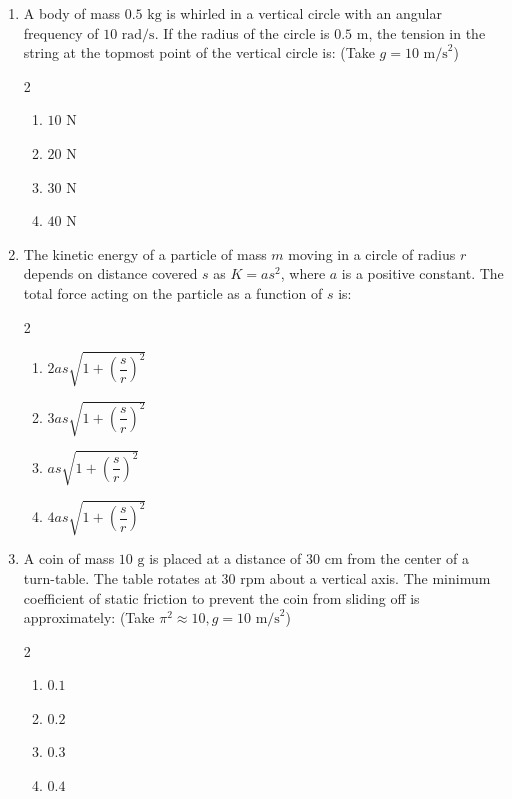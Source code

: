 \documentclass[11pt,a4paper]{article}
\begin{document}
\begin{enumerate}[label=\textbf{\textcolor{l2Amber}{Q\arabic*.}},leftmargin=24pt,itemsep=10pt,start=26]
  \item A body of mass $0.5\text{ kg}$ is whirled in a vertical circle with an angular frequency of $10\text{ rad/s}$. If the radius of the circle is $0.5\text{ m}$, the tension in the string at the topmost point of the vertical circle is: (Take $g = 10\text{ m/s}^2$)
  \begin{multicols}{2}
  \begin{enumerate}[label=\textbf{\textcolor{primaryDark}{(\Alph*)}},itemsep=2pt]
    \item $10\text{ N}$
    \item $20\text{ N}$
    \item $30\text{ N}$
    \item $40\text{ N}$
  \end{enumerate}
  \end{multicols}

  \item The kinetic energy of a particle of mass $m$ moving in a circle of radius $r$ depends on distance covered $s$ as $K = as^2$, where $a$ is a positive constant. The total force acting on the particle as a function of $s$ is:
  \begin{multicols}{2}
  \begin{enumerate}[label=\textbf{\textcolor{primaryDark}{(\Alph*)}},itemsep=2pt]
    \item $2as\sqrt{1 + \left(\dfrac{s}{r}\right)^2}$
    \item $3as\sqrt{1 + \left(\dfrac{s}{r}\right)^2}$
    \item $as\sqrt{1 + \left(\dfrac{s}{r}\right)^2}$
    \item $4as\sqrt{1 + \left(\dfrac{s}{r}\right)^2}$
  \end{enumerate}
  \end{multicols}

  \item A coin of mass $10\text{ g}$ is placed at a distance of $30\text{ cm}$ from the center of a turn-table. The table rotates at $30\text{ rpm}$ about a vertical axis. The minimum coefficient of static friction to prevent the coin from sliding off is approximately: (Take $\pi^2 \approx 10, g = 10\text{ m/s}^2$)
  \begin{multicols}{2}
  \begin{enumerate}[label=\textbf{\textcolor{primaryDark}{(\Alph*)}},itemsep=2pt]
    \item $0.1$
    \item $0.2$
    \item $0.3$
    \item $0.4$
  \end{enumerate}
  \end{multicols}


\end{enumerate}
\end{document}
